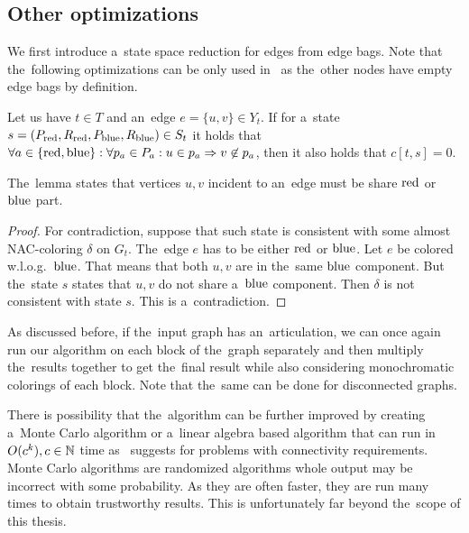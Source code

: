 \subsection{Other optimizations}

We first introduce a~state space reduction for edges from edge bags.
%
Note that the~following optimizations can be only used in~\IntroduceEdgeNode{}
as the~other nodes have empty edge bags by definition.
%
\begin{lemma}
	Let us have \( t \in T \) and an~edge \( e = \{u, v\} \in Y_t \).
	If for a~state \( s = (P_{\text{red}}, R_{\text{red}}, P_{\text{blue}}, R_{\text{blue}}) \in S_t \)
	it holds that
	\( {\forall a \in \{\text{red}, \text{blue}\}} : {\forall p_a \in P_a} : {u \in p_a \Rightarrow v \not\in p_a} \),
	then it also holds that \( c[t, s] = 0 \).
\end{lemma}
%
The~lemma states that vertices \( u, v \) incident to an~edge must
be share \( \text{red} \) or \( \text{blue} \) part.
%
\begin{proof}
	For contradiction, suppose that such state is consistent
	with some almost NAC-coloring \( \delta \) on \( G_t \).
	The~edge \( e \) has to be either \( \text{red} \) or \( \text{blue} \).
	Let \( e \) be colored w.l.o.g.\ \( \text{blue} \).
	That means that both \( u, v \) are in the~same \( \text{blue} \) component.
	But the~state \( s \) states that \( u, v \) do not share a~\( \text{blue} \) component.
	Then \( \delta \) is not consistent with state \( s \).
	This is a~contradiction.
\end{proof}

As discussed before, if the~input graph has an~articulation,
we can once again run our algorithm on each block of the~graph separately
and then multiply the~results together to get the~final result
while also considering monochromatic colorings of each block.
Note that the~same can be done for disconnected graphs.

There is possibility that the~algorithm can be further improved by creating
a~Monte Carlo algorithm or a~linear algebra based algorithm that can run
in~\( O(c^k), c \in \mathbb{N} \) time as~\cite{book_parametrized_algorithms} suggests
for problems with connectivity requirements.
Monte Carlo algorithms are randomized algorithms whole output may be incorrect
with some probability. As they are often faster, they are run many times
to obtain trustworthy results.
This is unfortunately far beyond the~scope of this thesis.

